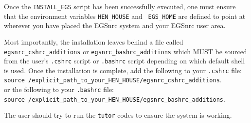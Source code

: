 Once the \verb+INSTALL_EGS+ script has been successfully executed, one
must ensure that the environment variables {\tt HEN\_HOUSE} and {\tt
EGS\_HOME} are defined to
point at wherever you have placed the EGSnrc system and your EGSnrc user
area.

Most importantly, the installation leaves behind a file called
\verb+egsnrc_cshrc_additions+ or \verb+egsnrc_bashrc_additions+
which MUST be sourced from the user's
{\tt .cshrc} script or {\tt .bashrc} script depending on which default
shell is used. Once the installation is complete,
add the following to your {\tt .cshrc} file:\\
\verb+source /explicit_path_to_your_HEN_HOUSE/egsnrc_cshrc_additions+. \\
or the following to your {\tt .bashrc} file:\\
\verb+source /explicit_path_to_your_HEN_HOUSE/egsnrc_bashrc_additions+. \\

The user should try to run the {\tt tutor} codes to ensure the system is working.

%


